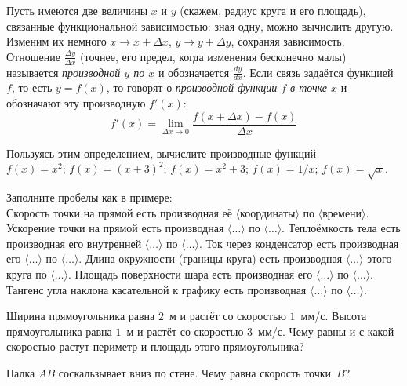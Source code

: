 \documentclass[a4paper,12pt]{article}
\begin{document}

Пусть имеются две величины $x$ и $y$ (скажем, радиус круга и его площадь), связанные функциональной зависимостью: зная одну, можно вычислить другую. Изменим их немного $x\to x+\Delta x$, $y\to y+\Delta y$, сохраняя зависимость. Отношение $\frac{\Delta y}{\Delta x}$ (точнее, его предел, когда изменения бесконечно малы) называется \emph{производной $y$ по $x$} и обозначается $\frac{dy}{dx}$.  Если связь задаётся функцией $f$, то есть $y=f(x)$, то говорят о \emph{производной функции $f$  в точке $x$} и обозначают эту производную $f'(x)$:
\[
f'(x)=\lim_{\Delta x \to 0} \frac{f(x+\Delta x)-f(x)}{\Delta x}
\]

Пользуясь этим определением, вычислите производные функций
\\
 $f(x)=x^2$;
 $f(x)=(x+3)^2$;
 $f(x)=x^2+3$;
 $f(x)=1/x$;
 $f(x)=\sqrt{x}$.

Заполните пробелы как в примере:\\
Скорость точки на прямой есть производная её $\langle$координаты$\rangle$ по $\langle$времени$\rangle$.
 Ускорение точки на прямой есть производная $\langle\ldots\rangle$ по $\langle\ldots\rangle$.
 Теплоёмкость тела есть производная его внутренней $\langle\ldots\rangle$ по $\langle\ldots\rangle$.
 Ток через конденсатор есть производная его $\langle\ldots\rangle$ по $\langle\ldots\rangle$.
 Длина окружности (границы круга) есть производная $\langle\ldots\rangle$  этого круга по $\langle\ldots\rangle$.
 Площадь поверхности шара есть производная его $\langle\ldots\rangle$ по $\langle\ldots\rangle$.
 Тангенс угла наклона касательной к графику есть производная $\langle\ldots\rangle$ по $\langle\ldots\rangle$.


Ширина прямоугольника равна $2$~м и растёт со скоростью $1$~мм/с. Высота прямоугольника равна $1$~м и растёт со скоростью $3$~мм/с. Чему равны и с какой скоростью растут периметр и площадь этого прямоугольника?


Палка $AB$ соскальзывает вниз по стене. Чему равна скорость точки~$B$?
\end{document}
